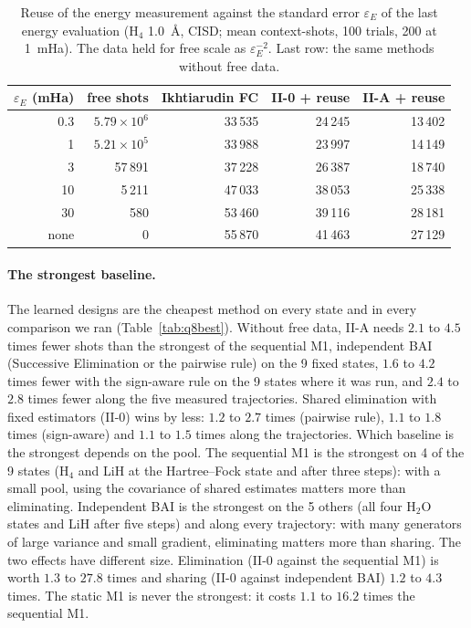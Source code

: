 \documentclass[aps,pra,reprint,superscriptaddress,nofootinbib]{revtex4-2}
\begin{document}
\begin{table}[!htb]
\centering\small
\caption{Reuse of the energy measurement against the standard error $\varepsilon_E$ of the last energy evaluation (H$_4$ 1.0~\AA, CISD; mean context-shots, 100 trials, 200 at 1~mHa). The data held for free scale as $\varepsilon_E^{-2}$. Last row: the same methods without free data.}
\label{tab:q8eps}
\footnotesize\setlength{\tabcolsep}{4pt}
\begin{tabular}{rrrrr}
\toprule
$\varepsilon_E$ (mHa) & free shots & Ikhtiarudin FC & II-0 + reuse & II-A + reuse \\
\midrule
0.3 & $5.79\times10^{6}$ & 33\,535 & 24\,245 & 13\,402 \\
1 & $5.21\times10^{5}$ & 33\,988 & 23\,997 & 14\,149 \\
3 & 57\,891 & 37\,228 & 26\,387 & 18\,740 \\
10 & 5\,211 & 47\,033 & 38\,053 & 25\,338 \\
30 & 580 & 53\,460 & 39\,116 & 28\,181 \\
\midrule
none & 0 & 55\,870 & 41\,463 & 27\,129 \\
\bottomrule
\end{tabular}
\end{table}

\paragraph{The strongest baseline.} The learned designs are the cheapest method on every state and in every comparison we ran (Table~\ref{tab:q8best}). Without free data, II-A needs $2.1$ to $4.5$ times fewer shots than the strongest of the sequential M1, independent BAI (Successive Elimination or the pairwise rule) on the 9 fixed states, $1.6$ to $4.2$ times fewer with the sign-aware rule on the 9 states where it was run, and $2.4$ to $2.8$ times fewer along the five measured trajectories. Shared elimination with fixed estimators (II-0) wins by less: $1.2$ to $2.7$ times (pairwise rule), $1.1$ to $1.8$ times (sign-aware) and $1.1$ to $1.5$ times along the trajectories. Which baseline is the strongest depends on the pool. The sequential M1 is the strongest on 4 of the 9 states (H$_4$ and LiH at the Hartree--Fock state and after three steps): with a small pool, using the covariance of shared estimates matters more than eliminating. Independent BAI is the strongest on the 5 others (all four H$_2$O states and LiH after five steps) and along every trajectory: with many generators of large variance and small gradient, eliminating matters more than sharing. The two effects have different size. Elimination (II-0 against the sequential M1) is worth $1.3$ to $27.8$ times and sharing (II-0 against independent BAI) $1.2$ to $4.3$ times. The static M1 is never the strongest: it costs $1.1$ to $16.2$ times the sequential M1.
\end{document}
